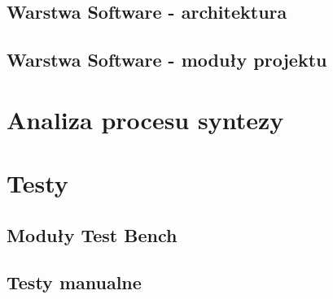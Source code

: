 \documentclass[12pt] {article}
\begin{document}
\subsection{Warstwa Software - architektura}
\subsection{Warstwa Software - moduły projektu}

\section{Analiza procesu syntezy}

\section{Testy}
\subsection{Moduły Test Bench}
\subsection{Testy manualne}
\end{document}
